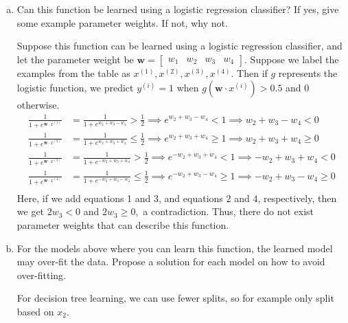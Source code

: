 \documentclass{article}
\begin{document}
\begin{enumerate}[(a)]
	\item Can this function be learned using a logistic regression classifier? If yes, give some example parameter weights. If not, why not.
		\begin{soln}
			Suppose this function can be learned using a logistic regression classifier, and let the parameter weight be $\mathbf{w} = \begin{bmatrix}
				w_1 & w_2 & w_3 & w_4
			\end{bmatrix}.$ Suppose we label the examples from the table as $x^{(1)}, x^{(2)}, x^{(3)}, x^{(4)}.$ Then if $g$ represents the logistic function, we predict $y^{(i)}=1$ when $g\left(\mathbf{w}\cdot x^{(i)}\right) > 0.5$ and 0 otherwise. 
			\begin{align*}
				\frac{1}{1+e^{\mathbf{w}\cdot x^{(1)}}} &= \frac{1}{1+e^{w_2+w_3-w_4}} > \frac{1}{2} \implies e^{w_2+w_3-w_4} < 1 \implies w_2+w_3-w_4 < 0 \\
				\frac{1}{1+e^{\mathbf{w}\cdot x^{(2)}}} &= \frac{1}{1+e^{w_2+w_3+w_4}} \le \frac{1}{2} \implies e^{w_2+w_3+w_4} \ge 1 \implies w_2+w_3+w_4 \ge 0 \\
				\frac{1}{1+e^{\mathbf{w}\cdot x^{(3)}}} &= \frac{1}{1+e^{-w_2+w_3+w_4}} > \frac{1}{2} \implies e^{-w_2+w_3+w_4} < 1 \implies -w_2+w_3+w_4 < 0 \\
				\frac{1}{1+e^{\mathbf{w}\cdot x^{(4)}}} &= \frac{1}{1+e^{-w_2+w_3-w_4}} \le \frac{1}{2} \implies e^{-w_2+w_3-w_4} \ge 1 \implies -w_2+w_3-w_4 \ge 0 \\
			\end{align*}
			Here, if we add equations 1 and 3, and equations 2 and 4, respectively, then we get $2w_3 < 0$ and $2w_3\ge 0,$ a contradiction. Thus, there do not exist parameter weights that can describe this function.
		\end{soln}

	\item For the models above where you can learn this function, the learned model may over-fit the data. Propose a solution for each model on how to avoid over-fitting.
		\begin{answer*}
			For decision tree learning, we can use fewer splits, so for example only split based on $x_2.$ 
		\end{answer*}
\end{enumerate}

\newpage
\end{document}
